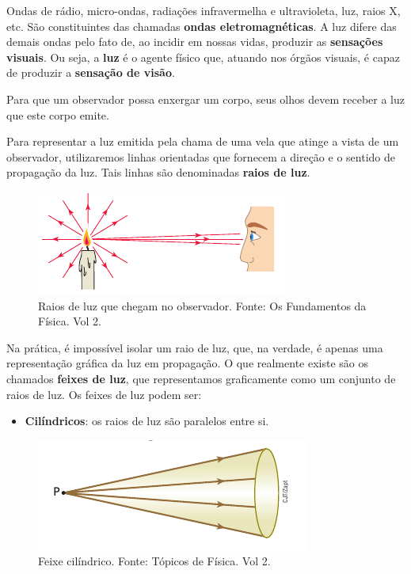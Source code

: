 \documentclass[11pt,twocolumn,oneside]{article}
\begin{document}
Ondas de rádio, micro-ondas, radiações infravermelha e ultravioleta, luz, raios X, etc. São constituintes das chamadas \textbf{ondas eletromagnéticas}. A luz difere das demais ondas pelo fato de, ao incidir em nossas vidas, produzir as \textbf{sensações visuais}. Ou seja, a \textbf{luz} é o agente físico que, atuando nos órgãos visuais, é capaz de produzir a \textbf{sensação de visão}.


Para que um observador possa enxergar um corpo, seus olhos devem receber a luz que este corpo emite.


Para representar a luz emitida pela chama de uma vela que atinge a vista de um observador, utilizaremos linhas orientadas que fornecem a direção e o sentido de propagação da luz. Tais linhas são denominadas \textbf{raios de luz}.


\begin{figure}[h]{}
\centering\includegraphics[width=2.5truein]{img0.png}
\caption{Raios de luz que chegam no observador. Fonte: Os Fundamentos da Física. Vol 2.}
\centering
\end{figure}

Na prática, é impossível isolar um raio de luz, que, na verdade, é apenas uma representação gráfica da luz em propagação. O que realmente existe são os chamados \textbf{feixes de luz}, que representamos graficamente como um conjunto de raios de luz. Os feixes de luz podem ser:


\begin{itemize}

\item \textbf{Cilíndricos}: os raios de luz são paralelos entre si.

\end{itemize}


\begin{figure}[h]{}
\centering\includegraphics[width=2.5truein]{img1.png}
\caption{Feixe cilíndrico. Fonte: Tópicos de Física. Vol 2.}
\centering
\end{figure}
\end{document}
